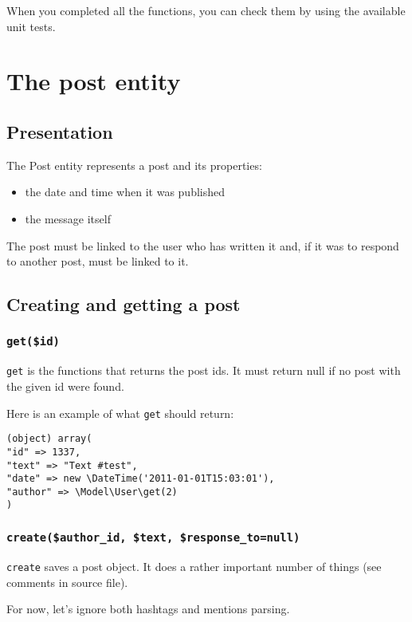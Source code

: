 \documentclass[twoside,a4paper,12pt]{article}
\begin{document}
When you completed all the functions, you can check them by using the available unit tests.

\section{The post entity}

\subsection{Presentation}

The Post entity represents a post and its properties:

\begin{itemize}
\item the date and time when it was published
\item the message itself
\end{itemize}

The post must be linked to the user who has written it and, if it was to respond to another post, must be linked to it.

\subsection{Creating and getting a post}

\subsubsection{\texttt{get(\$id)}}

\texttt{get} is the functions that returns the post ids. It must return null if no post with the given id were found.

Here is an example of what \texttt{get} should return:

\begin{lstlisting}
(object) array(
"id" => 1337,
"text" => "Text #test",
"date" => new \DateTime('2011-01-01T15:03:01'),
"author" => \Model\User\get(2)
)
\end{lstlisting}

\subsubsection{\texttt{create(\$author\_id, \$text, \$response\_to=null)}}

\texttt{create} saves a post object. It does a rather important number of things (see comments in source file).

For now, let's ignore both hashtags and mentions parsing.
\end{document}
